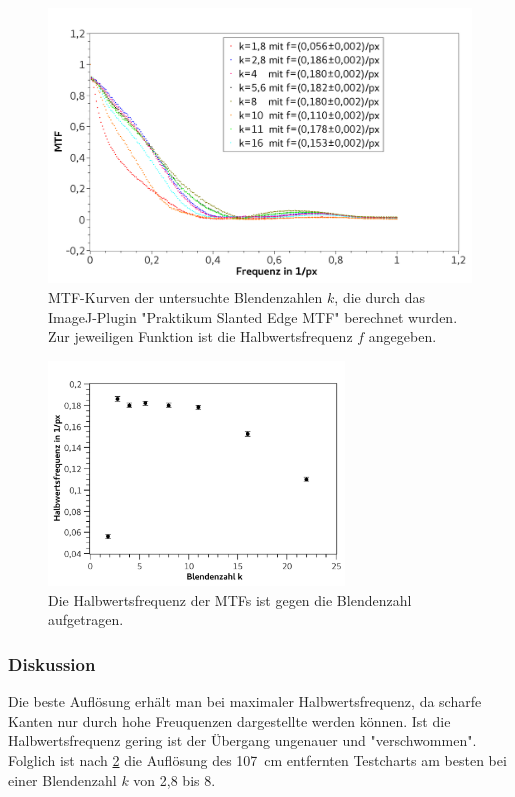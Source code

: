 \documentclass[
	a4paper,
	12pt,
	pagesize,
	ngerman
]{scrartcl}
\begin{document}
	\begin{figure}[H]  
		\includegraphics[width=1\textwidth]{fig_schraeg_kant}
		\centering
		\caption{
			MTF-Kurven der untersuchte Blendenzahlen $k$, die durch das ImageJ-Plugin "Praktikum Slanted Edge MTF" berechnet wurden.
			Zur jeweiligen Funktion ist die Halbwertsfrequenz $f$ angegeben.
			}
		\label{fig_schraeg_kante_mtf}
		\centering
	\end{figure}

	\begin{figure}[H]  
		\includegraphics[width=0.7\textwidth]{fig_schraeg_kant_2}
		\centering
		\caption{
			Die Halbwertsfrequenz der MTFs ist gegen die Blendenzahl aufgetragen.
			}
		\label{fig_schraeg_kante}
		\centering
	\end{figure}

	\subsubsection{Diskussion}
	Die beste Auflösung erhält man bei maximaler Halbwertsfrequenz, da scharfe Kanten nur durch hohe Freuquenzen dargestellte werden können. 
	Ist die Halbwertsfrequenz gering ist der Übergang ungenauer und "verschwommen".
	Folglich ist nach \cref{fig_schraeg_kante} die Auflösung des \SI{107}{cm} entfernten Testcharts am besten bei einer Blendenzahl $k$ von 2,8 bis 8.
	
\end{document}
